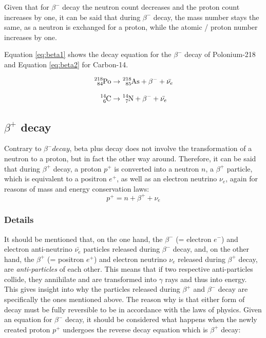 Given that for $\beta^-$ decay the neutron count decreases and the proton count increases by one, it can be said that during $\beta^-$ decay, the mass number stays the same, as a neutron is exchanged for a proton, while the atomic / proton number increases by one.

Equation \ref{eq:beta1} shows the decay equation for the $\beta^-$ decay of Polonium-218 and Equation \ref{eq:beta2} for Carbon-14.

\begin{equation}
  \ce{^{218}_{84}Po} \rightarrow \ce{^{218}_{85}As} + \beta^- + \bar{\nu_{e}}
  \label{eq:beta1}
\end{equation}

\begin{equation}
  \ce{^{14}_{6}C} \rightarrow \ce{^{14}_{7}N} + \beta^- + \bar{\nu_{e}}
  \label{eq:beta2}
\end{equation}

\subsection*{$\beta^+$ decay}

Contrary to $\beta^- decay$, beta plus decay does not involve the transformation of a neutron to a proton, but in fact the other way around. Therefore, it can be said that during $\beta^+$ decay, a proton $p^+$ is converted into a neutron $n$, a $\beta^+$ particle, which is equivalent to a positron $e^+$, as well as an electron neutrino $\nu_{e}$, again for reasons of mass and energy conservation laws: $$p^+ = n + \beta^+ + \nu_{e}$$

\subsubsection*{Details}

It should be mentioned that, on the one hand, the $\beta^-$ (= electron $e^-$) and electron anti-neutrino $\bar{\nu_{e}}$ particles released during $\beta^-$ decay, and, on the other hand, the $\beta^+$ (= positron $e^+$) and electron neutrino $\nu_{e}$ released during $\beta^+$ decay, are \emph{anti-particles} of each other. This means that if two respective anti-particles collide, they annihilate and are transformed into $\gamma$ rays and thus into energy. This gives insight into why the particles released during $\beta^+$ and $\beta^-$ decay are specifically the ones mentioned above. The reason why is that either form of decay must be fully reversible to be in accordance with the laws of physics. Given an equation for $\beta^-$ decay, it should be considered what happens when the newly created proton $p^+$ undergoes the reverse decay equation which is $\beta^+$ decay: 

